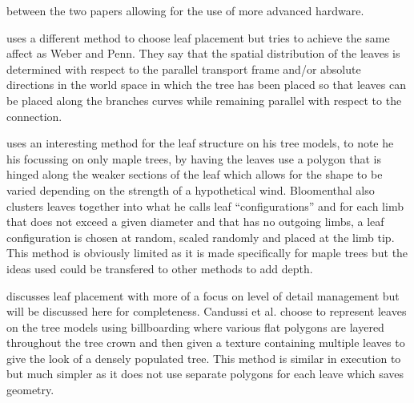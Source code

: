 \documentclass[review]{cmpreport}
\begin{document}
between the two papers allowing for the use of more advanced hardware. \par
\cite{runions2007colonization} uses a different method to choose leaf placement but tries 
to achieve the same affect as Weber and Penn. They say that the spatial distribution of the 
leaves is determined with respect to the parallel transport frame and/or absolute directions 
in the world space in which the tree has been placed so that leaves can be placed along the 
branches curves while remaining parallel with respect to the connection. 
\par
\cite{bloomenthal1985modeling} uses an interesting method for the leaf structure on his tree 
models, to note he his focussing on only maple trees, by having the leaves use a polygon that 
is hinged along the weaker sections of the leaf which allows for the shape to be varied 
depending on the strength of a hypothetical wind. Bloomenthal also clusters leaves together 
into what he calls leaf ``configurations'' and for each limb that does not exceed a given 
diameter and that has no outgoing limbs, a leaf configuration is chosen at random, scaled 
randomly and placed at the limb tip. This method is obviously limited as it is made specifically 
for maple trees but the ideas used could be transfered to other methods to add depth.\par
\cite{candussi2005rendering} discusses leaf placement with more of a focus on level of detail 
management but will be discussed here for completeness. Candussi et al. choose to represent 
leaves on the tree models using billboarding where various flat polygons are layered throughout 
the tree crown and then given a texture containing multiple leaves to give the look of a 
densely populated tree. This method is similar in execution to \cite{bloomenthal1985modeling} 
but much simpler as it does not use separate polygons for each leave which saves geometry.
\end{document}
